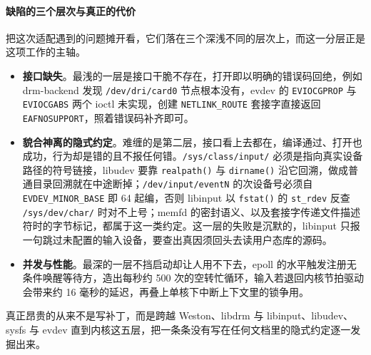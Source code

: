\paragraph{缺陷的三个层次与真正的代价}
把这次适配遇到的问题摊开看，它们落在三个深浅不同的层次上，而这一分层正是这项工作的主轴。
\begin{itemize}
\item \textbf{接口缺失}。最浅的一层是接口干脆不存在，打开即以明确的错误码回绝，例如 drm-backend 发现 \texttt{/dev/dri/card0} 节点根本没有，evdev 的 \texttt{EVIOCGPROP} 与 \texttt{EVIOCGABS} 两个 ioctl 未实现，创建 \texttt{NETLINK\_ROUTE} 套接字直接返回 \texttt{EAFNOSUPPORT}，照着错误码补齐即可。
\item \textbf{貌合神离的隐式约定}。难缠的是第二层，接口看上去都在，编译通过、打开也成功，行为却是错的且不报任何错。\texttt{/sys/class/input/} 必须是指向真实设备路径的符号链接，libudev 要靠 \texttt{realpath()} 与 \texttt{dirname()} 沿它回溯，做成普通目录回溯就在中途断掉；\texttt{/dev/input/eventN} 的次设备号必须自 \texttt{EVDEV\_MINOR\_BASE} 即 64 起编，否则 libinput 以 \texttt{fstat()} 的 \texttt{st\_rdev} 反查 \texttt{/sys/dev/char/} 时对不上号；memfd 的密封语义、以及套接字传递文件描述符时的字节标记，都属于这一类约定。这一层的失败是沉默的，libinput 只报一句跳过未配置的输入设备，要查出真因须回头去读用户态库的源码。
\item \textbf{并发与性能}。最深的一层不挡启动却让人用不下去，epoll 的水平触发注册无条件唤醒等待方，造出每秒约 500 次的空转忙循环，输入若退回内核节拍驱动会带来约 16 毫秒的延迟，再叠上单核下中断上下文里的锁争用。
\end{itemize}
真正昂贵的从来不是写补丁，而是跨越 Weston、libdrm 与 libinput、libudev、sysfs 与 evdev 直到内核这五层，把一条条没有写在任何文档里的隐式约定逐一发掘出来。

